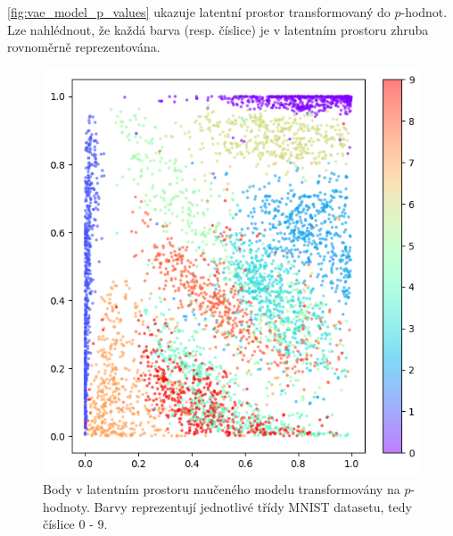 \autoref{fig:vae_model_p_values} ukazuje latentní prostor transformovaný do $p$-hodnot.
Lze nahlédnout, že každá barva (resp. číslice) je v latentním prostoru zhruba rovnoměrně reprezentována.

\begin{figure}[H]
    \centering
    \includegraphics[width=\textwidth]{figures/vae_latent_space_p_values.png}
    \caption{Body v latentním prostoru naučeného modelu transformovány na $p$-hodnoty. Barvy reprezentují jednotlivé třídy MNIST datasetu, tedy číslice $0$ - $9$. }
    \label{fig:vae_model_p_values}
\end{figure}